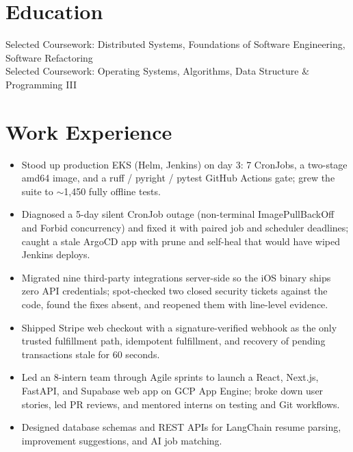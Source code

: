 \documentclass[11pt, letterpaper]{article}
\begin{document}

\section{Education}
Selected Coursework: Distributed Systems, Foundations of Software Engineering, Software Refactoring\\[1pt]
Selected Coursework: Operating Systems, Algorithms, Data Structure \& Programming III

\section{Work Experience}
\begin{itemize}
  \item Stood up production EKS (Helm, Jenkins) on day 3: 7 CronJobs, a two-stage amd64 image, and a ruff / pyright / pytest GitHub Actions gate; grew the suite to $\sim$1{,}450 fully offline tests.
  \item Diagnosed a 5-day silent CronJob outage (non-terminal ImagePullBackOff and Forbid concurrency) and fixed it with paired job and scheduler deadlines; caught a stale ArgoCD app with prune and self-heal that would have wiped Jenkins deploys.
  \item Migrated nine third-party integrations server-side so the iOS binary ships zero API credentials; spot-checked two closed security tickets against the code, found the fixes absent, and reopened them with line-level evidence.
  \item Shipped Stripe web checkout with a signature-verified webhook as the only trusted fulfillment path, idempotent fulfillment, and recovery of pending transactions stale for 60 seconds.
\end{itemize}

\begin{itemize}
  \item Led an 8-intern team through Agile sprints to launch a React, Next.js, FastAPI, and Supabase web app on GCP App Engine; broke down user stories, led PR reviews, and mentored interns on testing and Git workflows.
  \item Designed database schemas and REST APIs for LangChain resume parsing, improvement suggestions, and AI job matching.
\end{itemize}
\end{document}
